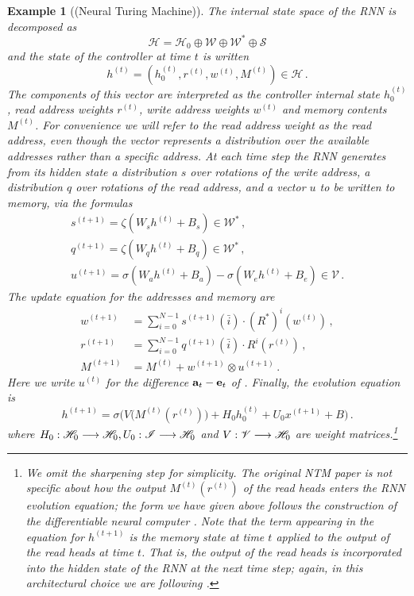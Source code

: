 \documentclass[english,letter paper,12pt,leqno]{article}
\theoremstyle{example}
\newtheorem{example}[theorem]{Example}
\numberwithin{equation}{section}
\def\be{\begin{equation}}
\def\ee{\end{equation}}
\begin{document}
\begin{example}[(Neural Turing Machine)]
The internal state space of the RNN is decomposed as
\[
\mathscr{H} = \mathscr{H}_0 \oplus \mathscr{W} \oplus \mathscr{W}^* \oplus \mathscr{S}
\]
and the state of the controller at time $t$ is written
\[
h^{(t)} = (h_0^{(t)}, r^{(t)}, w^{(t)}, M^{(t)}) \in \mathscr{H}\,.
\]
The components of this vector are interpreted as the \emph{controller internal state} $h_0^{(t)}$, \emph{read address weights} $r^{(t)}$, \emph{write address weights} $w^{(t)}$ and \emph{memory contents} $M^{(t)}$. For convenience we will refer to the read address weight as the \emph{read address}, even though the vector represents a distribution over the available addresses rather than a specific address. At each time step the RNN generates from its hidden state a distribution $s$ over rotations of the write address, a distribution $q$ over rotations of the read address, and a vector $u$ to be written to memory, via the formulas
\begin{gather*}
s^{(t+1)} = \zeta( W_s h^{(t)} + B_s ) \in \mathscr{W}^*\,,\\
q^{(t+1)} = \zeta( W_q h^{(t)} + B_q ) \in \mathscr{W}^*\,,\\
u^{(t+1)} = \sigma( W_a h^{(t)} + B_a ) - \sigma( W_e h^{(t)} + B_e ) \in \mathscr{V}\,.
\end{gather*}
The update equation for the addresses \cite[Eq. (8)]{ntm} and memory \cite[Eq. (3),(4)]{ntm} are
\begin{align*}
w^{(t+1)} &= \sum_{i=0}^{N-1} s^{(t+1)}(\bar{i}) \cdot (R^*)^i( w^{(t)} )\,,
\\
r^{(t+1)} &= \sum_{i=0}^{N-1} q^{(t+1)}(\bar{i}) \cdot R^i( r^{(t)} )\,,\\
M^{(t+1)} &= M^{(t)} + w^{(t+1)} \otimes u^{(t+1)}\,.
\end{align*}
Here we write $u^{(t)}$ for the difference $\bold{a}_t - \bold{e}_t$ of \cite[\S 3.2]{ntm}. Finally, the evolution equation is
\be\label{eq:NTMequation}
h^{(t+1)} = \sigma\Big( V\big( M^{(t)}(r^{(t)}) \big) + H_0 h_0^{(t)} + U_0 x^{(t+1)} + B \Big)\,.
\ee
where $H_0: \mathscr{H}_0 \longrightarrow \mathscr{H}_0, U_0: \mathscr{I} \longrightarrow \mathscr{H}_0$ and $V: \mathscr{V} \longrightarrow \mathscr{H}_0$ are weight matrices.\footnote{We omit the sharpening step \cite[Eq. (9)]{ntm} for simplicity. The original NTM paper \cite{ntm} is not specific about how the output $M^{(t)}(r^{(t)})$ of the read heads enters the RNN evolution equation; the form we have given above follows the construction of the differentiable neural computer \cite[p. 7]{dnc}. Note that the term appearing in the equation for $h^{(t+1)}$ is the memory state at time $t$ applied to the output of the read heads at time $t$. That is, the output of the read heads is incorporated into the hidden state of the RNN at the \emph{next} time step; again, in this architectural choice we are following \cite{dnc}.}
\\


\end{example}
\end{document}
